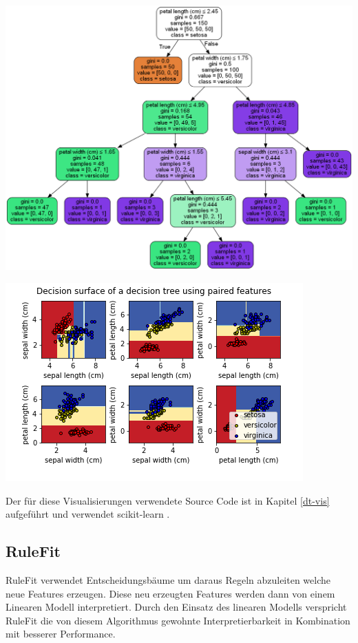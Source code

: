 \documentclass[
  12pt, %
  a4paper, %
  oneside, %
  openany, 
  numbers=noenddot, %
  BCOR=5mm, %
  parskip=half*, %
  thesis, %
]{bfhbook}
\begin{document}
\begin{minipage}[t]{0.45\linewidth}
\centering
	\includegraphics[width=\textwidth]{Bilder/iris-dt-explained.png}
\end{minipage}\hfill
\begin{minipage}[t]{0.45\linewidth}
\centering
	\includegraphics[width=\textwidth]{Bilder/iris-dt-decision-surface.png}
\end{minipage}

Der für diese Visualisierungen verwendete Source Code ist in Kapitel \ref{dt-vis} aufgeführt und verwendet scikit-learn \cite{scikit-learnLink}.


\subsection{RuleFit}
\label{RF}
RuleFit \parencite{Friedman2008} verwendet Entscheidungsbäume um daraus Regeln abzuleiten welche neue Features erzeugen. Diese neu erzeugten Features werden dann von einem Linearen Modell interpretiert. Durch den Einsatz des linearen Modells verspricht RuleFit die von diesem Algorithmus gewohnte Interpretierbarkeit in Kombination mit besserer Performance.
\end{document}
